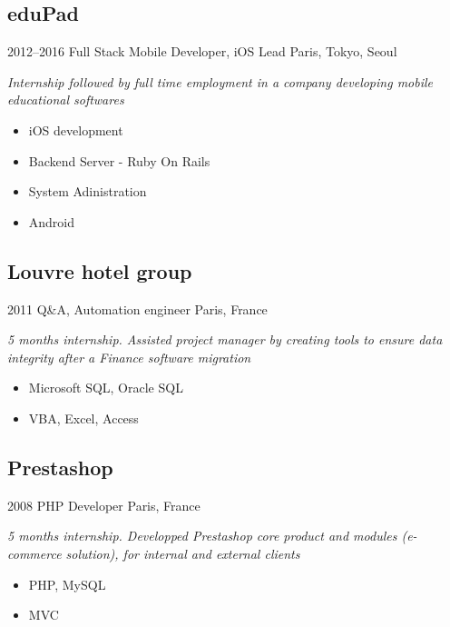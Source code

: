 \documentclass[]{template/friggeri-cv} %
\begin{document}
\subsection{eduPad}
\begin{entrylist}


\entry
{2012--2016}
{Full Stack Mobile Developer, iOS Lead}
{Paris, Tokyo, Seoul}
{\emph{Internship followed by full time employment in a company developing mobile educational softwares}\\
\begin{itemize}
\item{iOS development} 
\item{Backend Server - Ruby On Rails} 
\item{System Adinistration} 
\item{Android} 
\end{itemize}
}

\end{entrylist}



\subsection{Louvre hotel group}
\begin{entrylist}
\entry
{2011}
{Q\&A, Automation engineer}
{Paris, France}
{\emph{5 months internship. Assisted project manager by creating tools to ensure data integrity after a Finance software migration}

\begin{itemize}
\item {Microsoft SQL, Oracle SQL}
\item {VBA, Excel, Access}

\end{itemize}
}
\end{entrylist}

\goodbreak
\subsection{Prestashop}
\begin{entrylist}
\entry
{2008}
{PHP Developer}
{Paris, France}
{\emph{5 months internship. Developped Prestashop core product and modules (e-commerce solution), for internal and external clients}

\begin{itemize}

\item {PHP, MySQL}
\item {MVC}

\end{itemize}
}
\end{entrylist}
\end{document}
